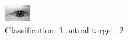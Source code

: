 \begin{figure}[h!]
\begin{center}
\includegraphics[width=0.60\columnwidth]{figures/ID459_class_1_target_2.png}
\end{center}
\caption{ Classification: 1 actual target: 2}
\label{fig:ID459_class_1_target_2}
\end{figure}

